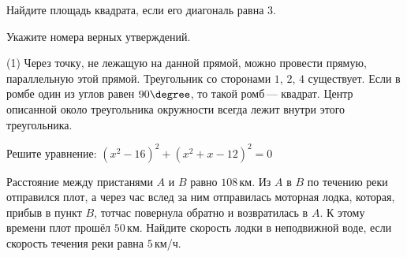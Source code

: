 \begin{homework}[number=4]
\begin{listofex}
		\item Найдите площадь квадрата, если его диагональ равна \( 3 \).
		\item Укажите номера верных утверждений.
		\begin{tasks}(1)
			\task Через точку, не лежащую на данной прямой, можно провести прямую, параллельную этой прямой.
			\task Треугольник со сторонами \( 1 \), \( 2 \), \( 4 \) существует.
			\task Если в ромбе один из углов равен \( 90\degree \), то такой ромб --- квадрат.
			\task Центр описанной около треугольника окружности всегда лежит внутри этого треугольника.
		\end{tasks}
		\item Решите уравнение: \( (x^2-16)^2+(x^2+x-12)^2=0 \)
		\item Расстояние между пристанями \( A \) и \( B \) равно \( 108 \) км. Из \( A \) в \( B \) по течению реки отправился плот, а через час вслед за ним отправилась моторная лодка, которая, прибыв в пункт \( B \), тотчас повернула обратно и возвратилась в \( A \). К этому времени плот прошёл \( 50 \) км. Найдите скорость лодки в неподвижной воде, если скорость течения реки равна \( 5 \) км/ч.
	\end{listofex}
\end{homework}
